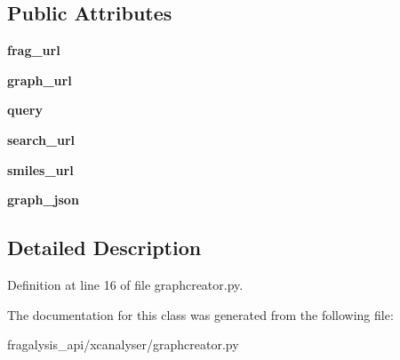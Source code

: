 \subsection*{Public Attributes}
\begin{DoxyCompactItemize}
\item 
\mbox{\label{classfragalysis__api_1_1xcanalyser_1_1graphcreator_1_1_graph_request_ac1d452fb3f9d6e80ba3a31e02145d043}} 
{\bfseries frag\+\_\+url}
\item 
\mbox{\label{classfragalysis__api_1_1xcanalyser_1_1graphcreator_1_1_graph_request_a8c195076876c81b0beada67b8757caf2}} 
{\bfseries graph\+\_\+url}
\item 
\mbox{\label{classfragalysis__api_1_1xcanalyser_1_1graphcreator_1_1_graph_request_a6f74c9499e8e158b9416880b3c7133a6}} 
{\bfseries query}
\item 
\mbox{\label{classfragalysis__api_1_1xcanalyser_1_1graphcreator_1_1_graph_request_a212573c4bde168c0fd5563124284e569}} 
{\bfseries search\+\_\+url}
\item 
\mbox{\label{classfragalysis__api_1_1xcanalyser_1_1graphcreator_1_1_graph_request_a9659e3db8ca34a5f3bb7c3186df87fe0}} 
{\bfseries smiles\+\_\+url}
\item 
\mbox{\label{classfragalysis__api_1_1xcanalyser_1_1graphcreator_1_1_graph_request_a564113897c119dfd6dcd066b12d1f481}} 
{\bfseries graph\+\_\+json}
\end{DoxyCompactItemize}


\subsection{Detailed Description}


Definition at line 16 of file graphcreator.\+py.



The documentation for this class was generated from the following file\+:\begin{DoxyCompactItemize}
\item 
fragalysis\+\_\+api/xcanalyser/graphcreator.\+py\end{DoxyCompactItemize}
